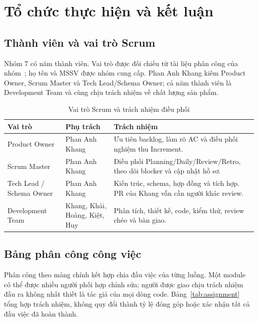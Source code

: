 \chapter{Tổ chức thực hiện và kết luận}
\label{chap:ket-luan}

\section{Thành viên và vai trò Scrum}
Nhóm 7 có năm thành viên. Vai trò được đối chiếu từ tài liệu phân công
của nhóm~\cite{roles,assignment}; họ tên và MSSV được nhóm cung cấp.
Phan Anh Khang kiêm Product Owner, Scrum Master và Tech Lead/Schema
Owner; cả năm thành viên là Development Team và cùng chịu trách nhiệm
về chất lượng sản phẩm.

\begin{table}[H]
\centering\small
\caption{Vai trò Scrum và trách nhiệm điều phối}
\label{tab:scrumroles}
\begin{tabularx}{\textwidth}{@{}L{0.22\textwidth}L{0.23\textwidth}Y@{}}
\toprule\textbf{Vai trò} & \textbf{Phụ trách} & \textbf{Trách nhiệm} \\\midrule
Product Owner & Phan Anh Khang & Ưu tiên backlog, làm rõ AC và điều phối nghiệm thu Increment. \\
Scrum Master & Phan Anh Khang & Điều phối Planning/Daily/Review/Retro, theo dõi blocker và cập nhật hồ sơ. \\
Tech Lead / Schema Owner & Phan Anh Khang & Kiến trúc, schema, hợp đồng và tích hợp. PR của Khang vẫn cần người khác review. \\
Development Team & Khang, Khải, Hoàng, Kiệt, Huy & Phân tích, thiết kế, code, kiểm thử, review chéo và bàn giao. \\
\bottomrule
\end{tabularx}
\end{table}

\section{Bảng phân công công việc}
\label{sec:assignment}
Phân công theo mảng chính kết hợp chia đầu việc của từng luồng. Một
module có thể được nhiều người phối hợp chỉnh sửa; người được giao chịu
trách nhiệm đầu ra không nhất thiết là tác giả của mọi dòng code.
Bảng~\ref{tab:assignment} tổng hợp trách nhiệm, không quy đổi thành tỷ lệ
đóng góp hoặc xác nhận tất cả đầu việc đã hoàn thành.

